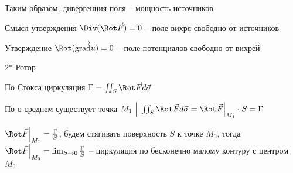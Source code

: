 \documentclass[12pt]{article}
\begin{document}
        Таким образом, дивергенция поля -- мощность источников

        \Notas Смысл утверждения $\Div (\Rot \vec F) = 0$ -- поле вихря свободно от источников

        \Notas Утверждение $\Rot (\overrightarrow{\operatorname{grad}} u) = 0$ -- поле потенциалов свободно от вихрей

    \mediumvspace

    \hypertarget{rotormechanicalmeaning}{}

    2* Ротор

        По \Ths Стокса циркуляция $\Gamma = \iint_S \Rot \vec{F} d\vec{\sigma}$

        По \Ths о среднем существует точка $M_1 \ \Big| \ \iint_S \Rot \vec{F} d\vec{\sigma} = \Rot \vec{F} \Big|_{M_1} \cdot S = \Gamma$

        $\Rot \vec{F} \Big|_{M_1} = \frac{\Gamma}{S}$, будем стягивать поверхность $S$ к точке $M_0$, тогда $\Rot \vec{F} \Big|_{M_0} = \lim_{S \to 0} \frac{\Gamma}{S}$ -- циркуляция по бесконечно малому контуру с центром $M_0$
\end{document}

